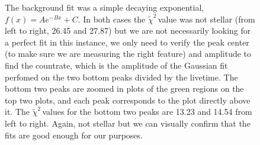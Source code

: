 \documentclass{article}
\newcommand{\redchi}{$\tilde{\chi}^2\,$}
\begin{document}
\begin{figure}[!htb]
\begin{tabular}{c c}
    \end{tabular}
    \caption{The background fit was a simple decaying exponential, $f(x) = Ae^{-Bx} + C$.  In both cases the \redchi value was not stellar (from left to right, 26.45 and 27.87) but we are not necessarily looking for a perfect fit in this instance, we only need to verify the peak center (to make sure we are measuring the right feature) and amplitude to find the countrate, which is the amplitude of the Gaussian fit perfomed on the two bottom peaks divided by the livetime.  The bottom two peaks are zoomed in plots of the green regions on the top two plots, and each peak corresponds to the plot directly above it.  The \redchi values for the bottom two peaks are 13.23 and 14.54 from left to right.  Again, not stellar but we can visually confirm that the fits are good enough for our purposes.}
    \label{nolead}
  \end{figure}
\end{document}
